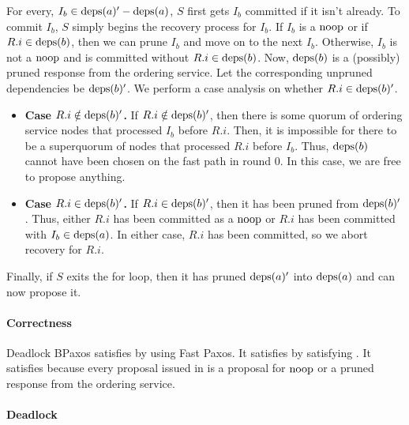 For every, $I_b \in \text{deps}(a)' - \text{deps}(a)$, $S$ first gets $I_b$ committed if it
isn't already. To commit $I_b$, $S$ simply begins the recovery process for
$I_b$. If $I_b$ is a $\text{noop}$ or if $R.i \in \text{deps}(b)$, then we can prune $I_b$
and move on to the next $I_b$. Otherwise, $I_b$ is not a $\text{noop}$ and is
committed without $R.i \in \text{deps}(b)$. Now, $\text{deps}(b)$ is a (possibly) pruned
response from the ordering service. Let the corresponding unpruned dependencies
be $\text{deps}(b)'$. We perform a case analysis on whether $R.i \in \text{deps}(b)'$.
\begin{itemize}
  \item \textbf{Case $R.i \notin \text{deps}(b)'$.}
    If $R.i \notin \text{deps}(b)'$, then there is some quorum of ordering service
    nodes that processed $I_b$ before $R.i$. Then, it is impossible for there
    to be a superquorum of nodes that processed $R.i$ before $I_b$. Thus,
    $\text{deps}(b)$ cannot have been chosen on the fast path in round $0$. In this
    case, we are free to propose anything.

  \item \textbf{Case $R.i \in \text{deps}(b)'$.}
    If $R.i \in \text{deps}(b)'$, then it has been pruned from $\text{deps}(b)'$. Thus,
    either $R.i$ has been committed as a $\text{noop}$ or $R.i$ has been committed
    with $I_b \in \text{deps}(a)$. In either case, $R.i$ has been committed, so we
    abort recovery for $R.i$.
\end{itemize}

Finally, if $S$ exits the for loop, then it has pruned $\text{deps}(a)'$ into
$\text{deps}(a)$ and can now propose it.

\paragraph{Correctness}
Deadlock BPaxos satisfies  by using Fast Paxos. It
satisfies  by satisfying
. It satisfies  because
every proposal issued in  is a proposal for $\text{noop}$ or
a pruned response from the ordering service.

\paragraph{Deadlock}

